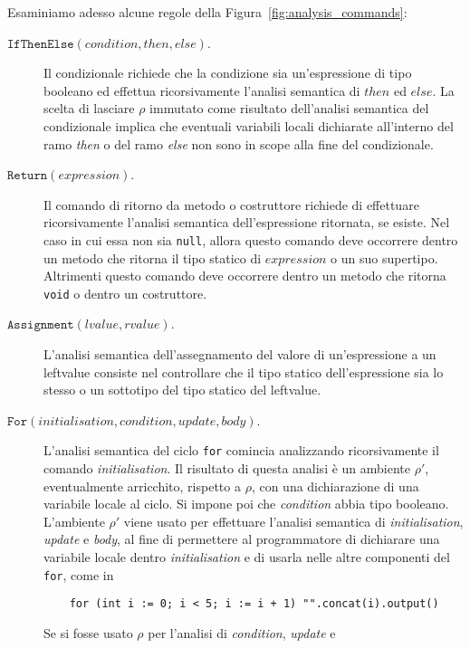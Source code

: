 Esaminiamo adesso alcune regole della Figura~\ref{fig:analysis_commands}:
%
\begin{description}
\item[\underline{$\mathtt{IfThenElse(\mathit{condition},\mathit{then},\mathit{else})}$}.]
  Il condizionale richiede che la condizione sia un'espressione di tipo
  booleano ed effettua ricorsivamente
  l'analisi semantica di $\mathit{then}$ ed $\mathit{else}$.
  La scelta di lasciare $\rho$ immutato come risultato
  dell'analisi semantica del condizionale implica che eventuali variabili
  locali dichiarate all'interno del ramo \textit{then} o del
  ramo \textit{else} non sono \piu in scope alla fine del condizionale.
\item[\underline{$\mathtt{Return(\mathit{expression})}$}.]
  Il comando di ritorno da metodo o costruttore richiede di effettuare
  ricorsivamente l'analisi semantica dell'espressione ritornata, se esiste.
  Nel caso in cui essa non sia \texttt{null}, allora questo comando deve
  occorrere dentro un metodo che ritorna il tipo statico
  di $\mathit{expression}$ o un suo supertipo. Altrimenti questo comando
  deve occorrere dentro un metodo che ritorna \texttt{void} o dentro
  un costruttore.
\item[\underline{$\mathtt{Assignment(\mathit{lvalue},\mathit{rvalue})}$}.]
  L'analisi semantica dell'assegnamento del valore di un'espressione
  a un leftvalue consiste nel controllare che il tipo statico dell'espressione
  sia lo stesso o un sottotipo del tipo statico del leftvalue.
\item[\underline{$\mathtt{For(\mathit{initialisation},\mathit{condition},
  \mathit{update},\mathit{body})}$}.]
  L'analisi semantica del ciclo \texttt{for} comincia analizzando
  ricorsivamente il comando \textit{initialisation}. Il risultato di questa
  analisi \`e un ambiente $\rho'$, eventualmente arricchito, rispetto a
  $\rho$, con una dichiarazione di una variabile locale al ciclo.
  Si impone poi che \textit{condition} abbia tipo booleano. L'ambiente $\rho'$
  viene usato per effettuare l'analisi
  semantica di \textit{initialisation}, \textit{update} e \textit{body},
  al fine di permettere al programmatore di dichiarare una variabile locale
  dentro \textit{initialisation} e di usarla nelle altre componenti del
  \texttt{for}, come in
  \begin{verbatim}
    for (int i := 0; i < 5; i := i + 1) "".concat(i).output()
  \end{verbatim}
  \vspace*{-2.5ex}
  Se si fosse usato $\rho$ per l'analisi di \emph{condition}, \emph{update} e

\end{description}
